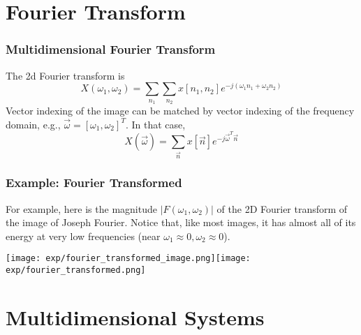 \documentclass{beamer}
\begin{document}
\section[Fourier]{Fourier Transform}
\setcounter{subsection}{1}

\begin{frame}
  \frametitle{Multidimensional Fourier Transform}

  The 2d Fourier transform is
  \begin{displaymath}
    X(\omega_1,\omega_2) = \sum_{n_1}\sum_{n_2}
    x[n_1,n_2]e^{-j\left(\omega_1n_1+\omega_2n_2\right)}
  \end{displaymath}
  Vector indexing of the image can be matched by vector indexing of
  the frequency domain, e.g.,
  $\vec\omega=[\omega_1,\omega_2]^T$.  In that case,
  \begin{displaymath}
    X(\vec\omega) = \sum_{\vec{n}}
    x[\vec{n}]e^{-j\vec\omega^T\vec{n}}
  \end{displaymath}
\end{frame}

\begin{frame}
  \frametitle{Example: Fourier Transformed}
  
  For example, here is the magnitude $|F(\omega_1,\omega_2)|$ of the
  2D Fourier transform of the image of Joseph Fourier.  Notice that,
  like most images, it has almost all of its energy at very low
  frequencies (near $\omega_1\approx 0, \omega_2\approx 0$).

  \centerline{\texttt{[image: exp/fourier\_transformed\_image.png]}\texttt{[image: exp/fourier\_transformed.png]}}
\end{frame}


\section[Systems]{Multidimensional Systems}
\setcounter{subsection}{1}


\end{document}
